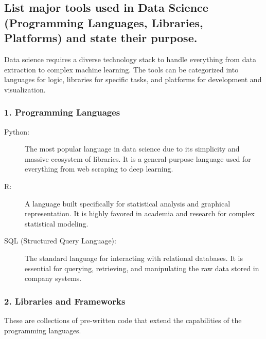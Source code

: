 \documentclass[a4paper,12pt]{article}
\begin{document}
\subsection{List major tools used in Data Science (Programming Languages, Libraries, Platforms) and state their purpose.}

Data science requires a diverse technology stack to handle everything from data extraction to complex machine learning. The tools can be categorized into languages for logic, libraries for specific tasks, and platforms for development and visualization.

\subsubsection{1. Programming Languages}
\begin{description}
    \item[Python:] The most popular language in data science due to its simplicity and massive ecosystem of libraries. It is a general-purpose language used for everything from web scraping to deep learning.
    \item[R:] A language built specifically for statistical analysis and graphical representation. It is highly favored in academia and research for complex statistical modeling.
    \item[SQL (Structured Query Language):] The standard language for interacting with relational databases. It is essential for querying, retrieving, and manipulating the raw data stored in company systems.
\end{description}

\subsubsection{2. Libraries and Frameworks}
These are collections of pre-written code that extend the capabilities of the programming languages.
\end{document}

